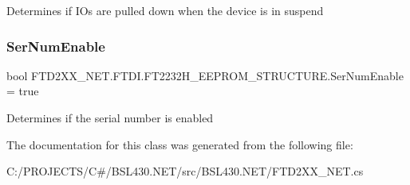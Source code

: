 Determines if I\+Os are pulled down when the device is in suspend 

\mbox{\label{class_f_t_d2_x_x___n_e_t_1_1_f_t_d_i_1_1_f_t2232_h___e_e_p_r_o_m___s_t_r_u_c_t_u_r_e_affdf9186a20d943f012b61d474ac858c}} 
\subsubsection{\texorpdfstring{SerNumEnable}{SerNumEnable}}
{\footnotesize\ttfamily bool F\+T\+D2\+X\+X\+\_\+\+N\+E\+T.\+F\+T\+D\+I.\+F\+T2232\+H\+\_\+\+E\+E\+P\+R\+O\+M\+\_\+\+S\+T\+R\+U\+C\+T\+U\+R\+E.\+Ser\+Num\+Enable = true}



Determines if the serial number is enabled 



The documentation for this class was generated from the following file\+:\begin{DoxyCompactItemize}
\item 
C\+:/\+P\+R\+O\+J\+E\+C\+T\+S/\+C\#/\+B\+S\+L430.\+N\+E\+T/src/\+B\+S\+L430.\+N\+E\+T/F\+T\+D2\+X\+X\+\_\+\+N\+E\+T.\+cs\end{DoxyCompactItemize}
